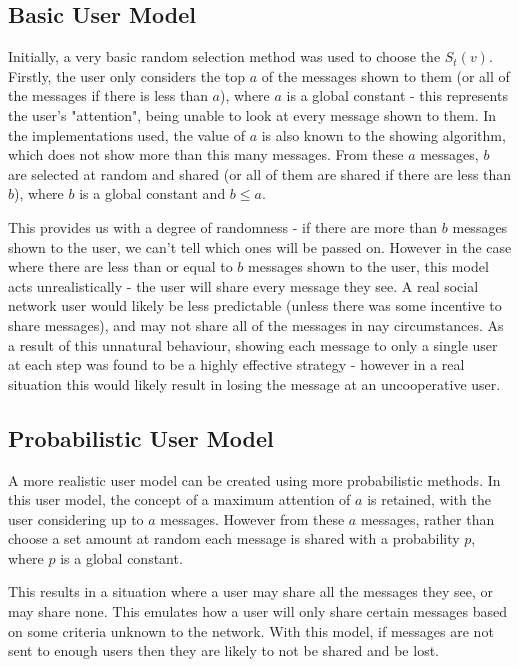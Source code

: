 \documentclass[bsc,frontabs,twoside,singlespacing,parskip,deptreport]{infthesis}     %
\begin{document}
\subsection{Basic User Model}
Initially, a very basic random selection method was used to choose the $S_{t}(v)$. Firstly, the user only considers the top $a$ of the messages shown to them (or all of the messages if there is less than $a$), where $a$ is a global constant - this represents the user's "attention", being unable to look at every message shown to them. In the implementations used, the value of $a$ is also known to the showing algorithm, which does not show more than this many messages. From these $a$ messages, $b$ are selected at random and shared (or all of them are shared if there are less than $b$), where $b$ is a global constant and $b \le a$.

This provides us with a degree of randomness - if there are more than $b$ messages shown to the user, we can't tell which ones will be passed on. However in the case where there are less than or equal to $b$ messages shown to the user, this model acts unrealistically - the user will share every message they see. A real social network user would likely be less predictable (unless there was some incentive to share messages), and may not share all of the messages in nay circumstances. As a result of this unnatural behaviour, showing each message to only a single user at each step was found to be a highly effective strategy - however in a real situation this would likely result in losing the message at an uncooperative user.

\subsection{Probabilistic User Model}
A more realistic user model can be created using more probabilistic methods. In this user model, the concept of a maximum attention of $a$ is retained, with the user considering up to $a$ messages. However from these $a$ messages, rather than choose a set amount at random each message is shared with a probability $p$, where $p$ is a global constant.

This results in a situation where a user may share all the messages they see, or may share none. This emulates how a user will only share certain messages based on some criteria unknown to the network. With this model, if messages are not sent to enough users then they are likely to not be shared and be lost.
\end{document}
